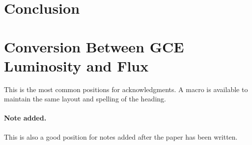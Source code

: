 \documentclass[a4paper,11pt]{article}
\newcommand{\comment}[1]{\emph{\color{red}{#1}}}
\begin{document}
\section{Conclusion}



\appendix
\section{Conversion Between GCE Luminosity and Flux}
\label{app:lum-to-flux}
\comment{Copy most of this from the January summary, if I include it.}





\acknowledgments

This is the most common positions for acknowledgments. A macro is
available to maintain the same layout and spelling of the heading.

\paragraph{Note added.} This is also a good position for notes added
after the paper has been written.









\end{document}
